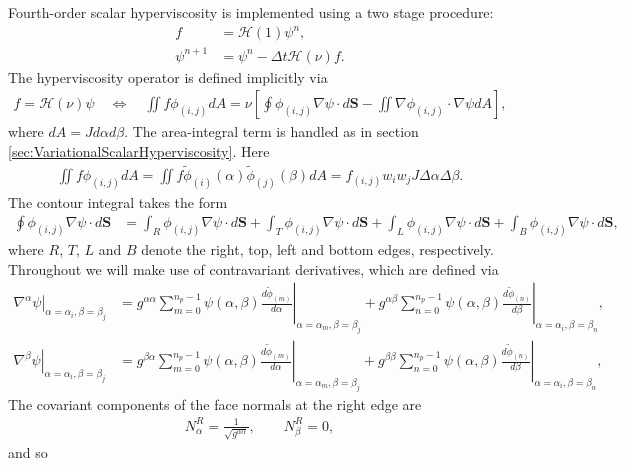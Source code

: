 \documentclass{article}
\newcommand{\vb}{\mathbf}
\newcommand{\diff}[2]{\frac{d #1}{d #2}}
\begin{document}
Fourth-order scalar hyperviscosity is implemented using a two stage procedure:
\begin{align}
f &= \mathcal{H}(1) \psi^n, \\
\psi^{n+1} &= \psi^n - \Delta t \mathcal{H}(\nu) f.
\end{align}  The hyperviscosity operator is defined implicitly via
\begin{align}
f = \mathcal{H}(\nu) \psi \quad \Longleftrightarrow \quad \iint f \phi_{(i,j)} dA = \nu \left[ \oint \phi_{(i,j)} \nabla \psi \cdot d\vb{S} - \iint \nabla \phi_{(i,j)} \cdot \nabla \psi dA \right],
\end{align} where $dA = J d\alpha d\beta$.  The area-integral term is handled as in section \ref{sec:VariationalScalarHyperviscosity}.  Here
\begin{align}
\iint f \phi_{(i,j)} dA = \iint f \tilde{\phi}_{(i)}(\alpha) \tilde{\phi}_{(j)}(\beta) dA = f_{(i,j)} w_i w_j J \Delta \alpha \Delta \beta.
\end{align}  The contour integral takes the form
\begin{align}
\oint \phi_{(i,j)} \nabla \psi \cdot d\vb{S} &= \int_R \phi_{(i,j)} \nabla \psi \cdot d\vb{S} + \int_T \phi_{(i,j)} \nabla \psi \cdot d\vb{S} + \int_L \phi_{(i,j)} \nabla \psi \cdot d\vb{S} + \int_B \phi_{(i,j)} \nabla \psi \cdot d\vb{S},
\end{align} where $R$, $T$, $L$ and $B$ denote the right, top, left and bottom edges, respectively.  Throughout we will make use of contravariant derivatives, which are defined via
\begin{align}
\left. \nabla^\alpha \psi \right\vert_{\alpha = \alpha_i, \beta = \beta_j} &= g^{\alpha \alpha} \sum_{m=0}^{n_p-1} \psi(\alpha, \beta) \left. \diff{\tilde{\phi}_{(m)}}{\alpha} \right\vert_{\alpha = \alpha_m, \beta = \beta_j} + g^{\alpha \beta} \sum_{n=0}^{n_p-1} \psi(\alpha, \beta) \left. \diff{\tilde{\phi}_{(n)}}{\beta} \right\vert_{\alpha = \alpha_{i}, \beta = \beta_n}, \\
\left. \nabla^\beta \psi \right\vert_{\alpha = \alpha_i, \beta = \beta_j} &= g^{\beta \alpha} \sum_{m=0}^{n_p-1} \psi(\alpha, \beta) \left. \diff{\tilde{\phi}_{(m)}}{\alpha} \right\vert_{\alpha = \alpha_m, \beta = \beta_j} + g^{\beta \beta} \sum_{n=0}^{n_p-1} \psi(\alpha, \beta) \left. \diff{\tilde{\phi}_{(n)}}{\beta} \right\vert_{\alpha = \alpha_{i}, \beta = \beta_n},
\end{align}  The covariant components of the face normals at the right edge are
\begin{align} \label{eq:CovariantNormal}
N^R_\alpha = \frac{1}{\sqrt{g^{\alpha \alpha}}}, \qquad N^R_\beta = 0,
\end{align} and so
\end{document}
